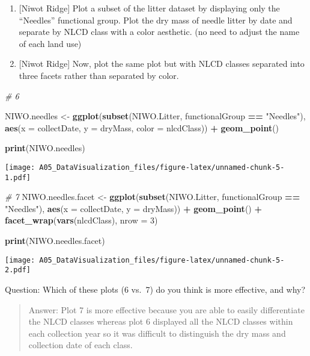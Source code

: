 \documentclass[]{article}
\newenvironment{Shaded}{\begin{snugshade}}{\end{snugshade}}
\newcommand{\KeywordTok}[1]{\textcolor[rgb]{0.13,0.29,0.53}{\textbf{#1}}}
\newcommand{\DataTypeTok}[1]{\textcolor[rgb]{0.13,0.29,0.53}{#1}}
\newcommand{\DecValTok}[1]{\textcolor[rgb]{0.00,0.00,0.81}{#1}}
\newcommand{\StringTok}[1]{\textcolor[rgb]{0.31,0.60,0.02}{#1}}
\newcommand{\CommentTok}[1]{\textcolor[rgb]{0.56,0.35,0.01}{\textit{#1}}}
\newcommand{\OperatorTok}[1]{\textcolor[rgb]{0.81,0.36,0.00}{\textbf{#1}}}
\newcommand{\NormalTok}[1]{#1}
\begin{document}
\begin{enumerate}
\def\labelenumi{\arabic{enumi}.}
\setcounter{enumi}{5}
\item
  {[}Niwot Ridge{]} Plot a subset of the litter dataset by displaying
  only the ``Needles'' functional group. Plot the dry mass of needle
  litter by date and separate by NLCD class with a color aesthetic. (no
  need to adjust the name of each land use)
\item
  {[}Niwot Ridge{]} Now, plot the same plot but with NLCD classes
  separated into three facets rather than separated by color.
\end{enumerate}

\begin{Shaded}
\begin{Highlighting}[]
\CommentTok{# 6}

\NormalTok{NIWO.needles <-}\StringTok{ }
\StringTok{  }\KeywordTok{ggplot}\NormalTok{(}\KeywordTok{subset}\NormalTok{(NIWO.Litter, functionalGroup }\OperatorTok{==}\StringTok{ "Needles"}\NormalTok{),}
         \KeywordTok{aes}\NormalTok{(}\DataTypeTok{x =}\NormalTok{ collectDate, }\DataTypeTok{y =}\NormalTok{ dryMass, }\DataTypeTok{color =}\NormalTok{ nlcdClass)) }\OperatorTok{+}
\StringTok{  }\KeywordTok{geom_point}\NormalTok{() }

 \KeywordTok{print}\NormalTok{(NIWO.needles)}
\end{Highlighting}
\end{Shaded}

\texttt{[image: A05\_DataVisualization\_files/figure-latex/unnamed-chunk-5-1.pdf]}

\begin{Shaded}
\begin{Highlighting}[]
\CommentTok{# 7}
\NormalTok{ NIWO.needles.facet <-}\StringTok{ }
\StringTok{   }\KeywordTok{ggplot}\NormalTok{(}\KeywordTok{subset}\NormalTok{(NIWO.Litter, functionalGroup }\OperatorTok{==}\StringTok{ "Needles"}\NormalTok{),}
         \KeywordTok{aes}\NormalTok{(}\DataTypeTok{x =}\NormalTok{ collectDate, }\DataTypeTok{y =}\NormalTok{ dryMass)) }\OperatorTok{+}
\StringTok{  }\KeywordTok{geom_point}\NormalTok{() }\OperatorTok{+}
\StringTok{   }\KeywordTok{facet_wrap}\NormalTok{(}\KeywordTok{vars}\NormalTok{(nlcdClass), }\DataTypeTok{nrow =} \DecValTok{3}\NormalTok{)}

  \KeywordTok{print}\NormalTok{(NIWO.needles.facet)}
\end{Highlighting}
\end{Shaded}

\texttt{[image: A05\_DataVisualization\_files/figure-latex/unnamed-chunk-5-2.pdf]}

Question: Which of these plots (6 vs.~7) do you think is more effective,
and why?

\begin{quote}
Answer: Plot 7 is more effective because you are able to easily
differentiate the NLCD classes whereas plot 6 displayed all the NLCD
classes within each collection year so it was difficult to distinguish
the dry mass and collection date of each class.
\end{quote}
\end{document}
